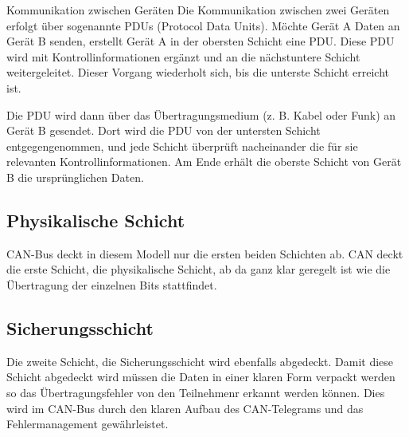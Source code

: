 Kommunikation zwischen Geräten
Die Kommunikation zwischen zwei Geräten erfolgt über sogenannte PDUs (Protocol Data Units).
Möchte Gerät A Daten an Gerät B senden, erstellt Gerät A in der obersten Schicht eine PDU. Diese PDU wird mit Kontrollinformationen ergänzt und an die nächstuntere Schicht weitergeleitet. Dieser Vorgang wiederholt sich, bis die unterste Schicht erreicht ist.

Die PDU wird dann über das Übertragungsmedium (z. B. Kabel oder Funk) an Gerät B gesendet. Dort wird die PDU von der untersten Schicht entgegengenommen, und jede Schicht überprüft nacheinander die für sie relevanten Kontrollinformationen. Am Ende erhält die oberste Schicht von Gerät B die ursprünglichen Daten.


\subsection{Physikalische Schicht}
CAN-Bus deckt in diesem Modell nur die ersten beiden Schichten ab. CAN deckt die erste Schicht, die physikalische Schicht, ab da ganz klar geregelt ist wie die Übertragung der einzelnen Bits stattfindet. 

\subsection{Sicherungsschicht}
Die zweite Schicht, die Sicherungsschicht wird ebenfalls abgedeckt. Damit diese Schicht abgedeckt wird müssen die Daten in einer klaren Form verpackt werden so das Übertragungsfehler von den Teilnehmenr erkannt werden können. Dies wird im CAN-Bus durch den klaren Aufbau des CAN-Telegrams und das Fehlermanagement gewährleistet.